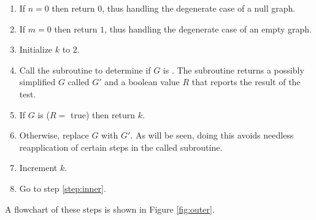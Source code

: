 \begin{enumerate}
\item \label{step:null} If \(n=0\) then return \(0\), thus handling the degenerate case of a null graph.

\item \label{step:one} If \(m=0\) then return \(1\), thus handling the degenerate case of an empty graph.

\item \label{step:init} Initialize \(k\) to \(2\).

\item \label{step:inner} Call the subroutine to determine if \(G\) is .  The subroutine returns a
  possibly simplified \(G\) called \(G'\) and a boolean value \(R\) that reports the result of the test.

\item \label{step:call} If \(G\) is  (\(R=\) true) then return \(k\).

\item \label{step:newg} Otherwise, replace \(G\) with \(G'\).  As will be seen, doing this avoids needless
  reapplication of certain steps in the called subroutine.

\item \label{step:incr} Increment \(k\).

\item \label{step:loop} Go to step \ref{step:inner}.
\end{enumerate}

A flowchart of these steps is shown in Figure \ref{fig:outer}.

